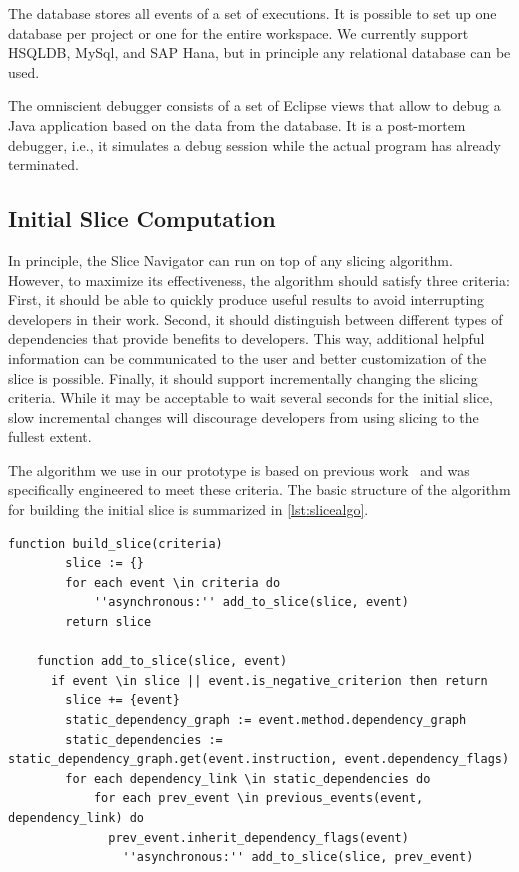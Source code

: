 \documentclass[
			english,
			review,
			]{elsarticle}
\begin{document}
The database stores all events of a set of executions.
It is possible to set up one database per project or one for the entire workspace.
We currently support HSQLDB, MySql, and SAP Hana, but in principle any relational database can be used.

The omniscient debugger consists of a set of Eclipse views that allow to debug a Java application based on the data from the database.
It is a post-mortem debugger, i.e., it simulates a debug session while the actual program has already terminated.

\subsection{Initial Slice Computation}

In principle, the Slice Navigator can run on top of any slicing algorithm.
However, to maximize its effectiveness, the algorithm should satisfy three criteria:
First, it should be able to quickly produce useful results to avoid interrupting developers in their work.
Second, it should distinguish between different types of dependencies that provide benefits to developers.
This way, additional helpful information can be communicated to the user and better customization of the slice is possible.
Finally, it should support incrementally changing the slicing criteria.
While it may be acceptable to wait several seconds for the initial slice, slow incremental changes will discourage developers from using slicing to the fullest extent.

The algorithm we use in our prototype is based on previous work~\cite{treffer_dynamic_2014} and was specifically engineered to meet these criteria.
The basic structure of the algorithm for building the initial slice is summarized in \cref{lst:slicealgo}.

\begin{lstlisting}[float=t,language=algorithm,label=lst:slicealgo,caption={Simplified algorithm for building the slice}]
	function build_slice(criteria)
		slice := {}
		for each event \in criteria do
			''asynchronous:'' add_to_slice(slice, event)
		return slice
		
	function add_to_slice(slice, event)
	  if event \in slice || event.is_negative_criterion then return
		slice += {event}
		static_dependency_graph := event.method.dependency_graph
		static_dependencies := static_dependency_graph.get(event.instruction, event.dependency_flags)
		for each dependency_link \in static_dependencies do
			for each prev_event \in previous_events(event, dependency_link) do
			  prev_event.inherit_dependency_flags(event)
				''asynchronous:'' add_to_slice(slice, prev_event)
\end{lstlisting}
\end{document}

